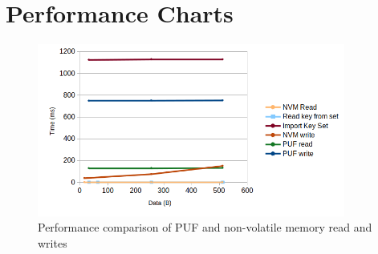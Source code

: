 \chapter{Performance Charts}
\label{chapter:appendixB}

\begin{figure}[h!]
	\centering
	\includegraphics[width=0.9\textwidth]{./Images/nvm-puf-time.png}
	\caption{Performance comparison of PUF and non-volatile memory read and writes}
	\label{fig:performance:nvm-puf-time}
\end{figure}
